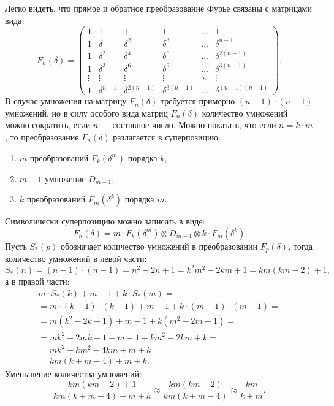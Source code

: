Легко видеть, что прямое и обратное преобразование Фурье связаны с матрицами вида:
\[
    F_n(\delta)
    = \begin{pmatrix}
        1      & 1            & 1               & 1               & \dots  & 1                   \\
        1      & \delta       & \delta^2        & \delta^3        & \dots  & \delta^{n-1}        \\
        1      & \delta^2     & \delta^4        & \delta^6        & \dots  & \delta^{2(n-1)}     \\
        1      & \delta^3     & \delta^6        & \delta^9        & \dots  & \delta^{3(n-1)}     \\
        \vdots & \vdots       & \vdots          & \vdots          & \ddots & \vdots              \\
        1      & \delta^{n-1} & \delta^{2(n-1)} & \delta^{3(n-1)} & \dots  & \delta^{(n-1)(n-1)}
    \end{pmatrix}.
\]
В случае умножения на матрицу $F_n(\delta)$ требуется примерно $(n-1) \cdot (n-1)$ умножений, но в силу особого вида матриц $F_n(\delta)$ количество умножений можно сократить,
если $n$ --- составное число. Можно показать, что если $n = k \cdot m$, то преобразование $F_n(\delta)$ разлагается в суперпозицию:
\begin{enumerate}
    \item $m$ преобразований $F_k(\delta^m)$ порядка $k$,
    \item $m-1$ умножение $D_{m-1}$,
    \item $k$ преобразований $F_m(\delta^k)$ порядка $m$.
\end{enumerate}
Символически суперпозицию можно записать в виде:
\[
    F_n(\delta) = m \cdot F_k(\delta^m) \otimes D_{m-1} \otimes k \cdot F_m(\delta^k)
\]
Пусть $S_*(p)$ обозначает количество умножений в преобразовании $F_p(\delta)$, тогда количество умножений в левой части:
\[
    S_*(n)
    = (n-1) \cdot (n-1)
    = n^2 - 2 n + 1
    = k^2 m^2 - 2 k m + 1
    = k m ( k m - 2 ) + 1,
\]
а в правой части:
\begin{multline*}
    m \cdot S_*(k) + m-1 + k \cdot S_*(m) = \\
    = m \cdot (k-1) \cdot (k-1) + m-1 + k \cdot (m-1) \cdot (m-1) = \\
    = m (k^2 - 2 k + 1) + m-1 + k (m^2 - 2 m + 1) = \\
    = m k^2 - 2 m k + 1 + m-1 + k m^2 - 2 k m + k = \\
    = m k^2 + k m^2 - 4 k m + m + k = \\
    = k m ( k + m - 4 ) + m + k .
\end{multline*}
Уменьшение количества умножений:
\[
    \frac{k m ( k m - 2 ) + 1}{k m ( k + m - 4 ) + m + k}
    \approx \frac{k m ( k m - 2 )}{k m ( k + m - 4 )}
    \approx \frac{k m}{k + m} .
\]

